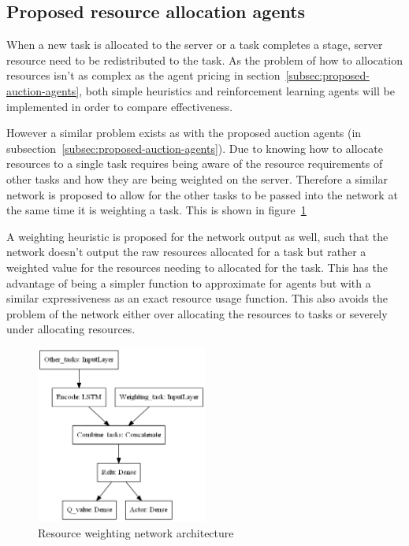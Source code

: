 \subsection{Proposed resource allocation agents}\label{subsec:proposed-resource-allocation-agents}
When a new task is allocated to the server or a task completes a stage, server resource need to be redistributed
to the task. As the problem of how to allocation resources isn't as complex as the agent pricing in
section~\ref{subsec:proposed-auction-agents}, both simple heuristics and reinforcement learning agents will be
implemented in order to compare effectiveness.

However a similar problem exists as with the proposed auction agents (in subsection~\ref{subsec:proposed-auction-agents}).
Due to knowing how to allocate resources to a single task requires being aware of the resource requirements of other
tasks and how they are being weighted on the server. Therefore a similar network is proposed to allow for the other tasks
to be passed into the network at the same time it is weighting a task. This is shown in
figure~\ref{fig:resource_weighting_network_architecture}

A weighting heuristic is proposed for the network output as well, such that the network doesn't output the raw
resources allocated for a task but rather a weighted value for the resources needing to allocated for the task.
This has the advantage of being a simpler function to approximate for agents but with a similar expressiveness as an
exact resource usage function. This also avoids the problem of the network either over allocating the resources to tasks
or severely under allocating resources.

\begin{figure}
    \centering
    \includegraphics[width=0.5\textwidth]{figures/2_solution_figs/resource_weighting_network_architecture.png}
    \caption{Resource weighting network architecture}
    \label{fig:resource_weighting_network_architecture}
\end{figure}


